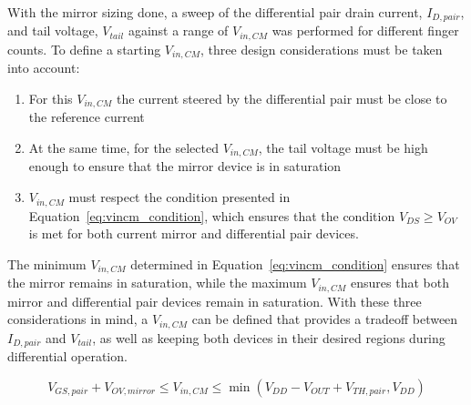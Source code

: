 With the mirror sizing done, a sweep of the differential pair drain current, $I_{D,pair}$, and tail voltage, $V_{tail}$ against a range of $V_{in,CM}$ was performed for different finger counts. To define a starting $V_{in,CM}$, three design considerations must be taken into account:

\begin{enumerate}
	\item For this $V_{in,CM}$ the current steered by the differential pair must be close to the reference current
	\item At the same time, for the selected $V_{in,CM}$, the tail voltage must be high enough to ensure that the mirror device is in saturation
	\item $V_{in,CM}$ must respect the condition presented in Equation~\eqref{eq:vincm_condition}, which ensures that the condition $V_{DS} \geq V_{OV}$ is met for both current mirror and differential pair devices.
\end{enumerate}

The minimum $V_{in,CM}$ determined in Equation~\eqref{eq:vincm_condition} ensures that the mirror remains in saturation, while the maximum $V_{in,CM}$ ensures that both mirror and differential pair devices remain in saturation.
With these three considerations in mind, a $V_{in,CM}$ can be defined that provides a tradeoff between $I_{D,pair}$ and $V_{tail}$, as well as keeping both devices in their desired regions during differential operation.

\begin{equation}
	V_{GS,pair} + V_{OV,mirror} \leq V_{in,CM} \leq \min(V_{DD} - V_{OUT} + V_{TH,pair},  V_{DD})
\label{eq:vincm_condition}
\end{equation}

